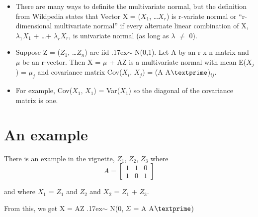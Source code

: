 \documentclass[12pt]{report}
\begin{document}
\begin{itemize}

\item There are many ways to definite the multivariate normal, but the definition from Wikipedia states that Vector X = ($X_{1}$, \ldots $X_{r}$) is r-variate normal or ``r-dimensional multivariate normal'' if every alternate linear combination of X, $\lambda_{1}$$X_{1}$ + \ldots + $\lambda_{r}$$X_{r}$, is univariate normal (as long as $\lambda$ $\neq$ 0).

\item Suppose Z = ($Z_{1}$, \ldots $Z_{n}$) are iid {\raise.17ex\hbox{$\scriptstyle\sim$}} N(0,1). Let A by an r x n matrix and $\mu$ be an r-vector. Then X = $\mu$ + AZ is a multivariate normal with mean E($X_{j}$) = $\mu_{j}$ and covariance matrix Cov($X_{i}$, $X_{j}$) = (A A$\textprime$)$ _{ij}$.

\item For example, Cov($X_{1}$, $X_{1}$) = Var($X_{1}$) so the diagonal of the covariance matrix is one. 

\end{itemize}

\section{An example}

There is an example in the vignette, $Z_{1}$, $Z_{2}$, $Z_{3}$ where 
 \[A=
  \begin{bmatrix}
    1 & 1 & 0 \\
    1 & 0 & 1
  \end{bmatrix}
\]

and where $X_{1}$ = $Z_{1}$ and $Z_{2}$ and $X_{2}$ = $Z_{1}$ + $Z_{3}$.

\bigskip
From this, we get X = AZ {\raise.17ex\hbox{$\scriptstyle\sim$}} N(0, $\Sigma$ = A A$\textprime$) 
\end{document}

